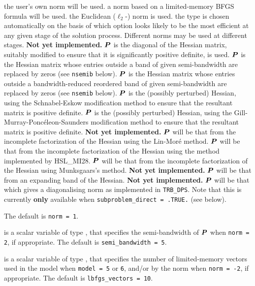 \documentclass{galahad}
\newcommand{\packagename}{TRB}
\begin{document}
\begin{description}
\begin{description}
 the user's own norm will be used.
 a norm based on a limited-memory BFGS formula will be used.
 the Euclidean ($\ell_2$-) norm is used.
 the type is chosen automatically on the basis of which option looks
        likely to be the most efficient at any given stage of the solution
        process. Different norms may be used at different stages.
        {\bf Not yet implemented.}
 ${\bm{P}}$ is the diagonal of the Hessian matrix, suitably modified to
        ensure that it is significantly positive definite, is used.
 ${\bm{P}}$ is the Hessian matrix whose entries outside a band of
         given semi-bandwidth are replaced by zeros
        (see {\tt nsemib} below).
 ${\bm{P}}$ is the Hessian matrix whose entries outside a
        bandwidth-reduced reordered band of given semi-bandwidth are
        replaced by zeros (see {\tt nsemib} below).
 ${\bm{P}}$ is the (possibly perturbed) Hessian,
         using the Schnabel-Eskow modification
        method to ensure that the resultant matrix is positive definite.
 ${\bm{P}}$ is the (possibly perturbed) Hessian,
        using the Gill-Murray-Ponc\'{e}leon-Saunders
        modification method to ensure that the resultant matrix is
        positive definite.
        {\bf Not yet implemented.}
 ${\bm{P}}$ will be that from the incomplete factorization of the Hessian
        using the Lin-Mor\'{e} method.
 ${\bm{P}}$ will be that from the incomplete factorization of the Hessian
        using the method implemented by HSL\_MI28.
 ${\bm{P}}$ will be that from the incomplete factorization of the Hessian
        using Munksgaars's method. {\bf Not yet implemented.}
 ${\bm{P}}$ will be that from an expanding band of the Hessian.
        {\bf Not yet implemented.}
 ${\bm{P}}$ will be that which gives a diagonalising norm as implemented in
         {\tt \packagename\_DPS}.
          Note that this is currently {\bf only} available
         when {\tt subproblem\_direct = .TRUE.} (see below).
\end{description}
The default is {\tt norm = 1}.

 is a scalar variable of type \integer,
that specifies
the semi-bandwidth of ${\bm{P}}$ when {\tt norm = 2},
if appropriate.
The default is {\tt semi\_bandwidth = 5}.

 is a scalar variable of type \integer,
that specifies the number of limited-memory vectors used in the model
when {\tt model = 5} or {\tt 6},
and/or by the norm when {\tt norm = -2},
if appropriate.
The default is {\tt lbfgs\_vectors = 10}.


\end{description}
\end{document}
